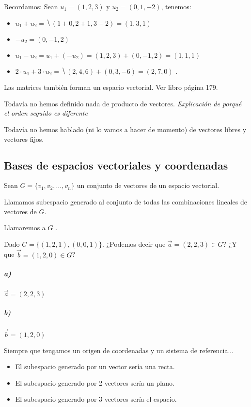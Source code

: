 %
\begin{example}
Recordamos:
Sean $u_1 = (1,2,3)$ y $u_2 = (0,1,-2)$, tenemos:
  \begin{itemize}
      \item $u_1 + u_2 = \hide{(1+0, 2+1, 3-2) = (1,3,1)}$
      \item $-u_2 = (0,-1,2)$
      \item $u_1-u_2 = u_1+ (-u_2) = (1,2,3) + (0,-1,2) = (1,1,1)$
      \item $2·u_1 + 3·u_2 = \hide{(2,4,6) + (0,3,-6) = (2,7,0)}$
      \obs {}.
  \end{itemize}
\end{example}

\obs Las matrices también forman un espacio vectorial. Ver libro página 179.

\obs Todavía no hemos definido nada de producto de vectores. \textit{Explicación de porqué el orden seguido es diferente}

\obs Todavía no hemos hablado (ni lo vamos a hacer de momento) de vectores libres y vectores fijos.

\subsection{Bases de espacios vectoriales y coordenadas}

\begin{defn} 
Sean $ G = \{v_1,v_2,...,v_n\}$ un conjunto de vectores de un espacio vectorial.

Llamamos subespacio generado al conjunto de todas las combinaciones lineales de vectores de $G$.

\obs Llamaremos a $G$ .
\end{defn}

\begin{example}
Dado $G=\{(1,2,1) , (0,0,1)\}$. ¿Podemos decir que $\vec{a} = (2,2,3) \in G$? ¿Y que $\vec{b} = (1,2,0)\in G$?


\subparagraph{a)} $\vec{a} = (2,2,3)$\\

\subparagraph{b)} $\vec{b} = (1,2,0)$\\

\end{example}

\begin{example}

Siempre que tengamos un origen de coordenadas y un sistema de referencia...

\begin{itemize}
  \item El subespacio generado por un vector sería una recta.
  \item El subespacio generado por 2 vectores sería un plano.
  \item El subespacio generado por 3 vectores sería el espacio.
\end{itemize}
\end{example}

